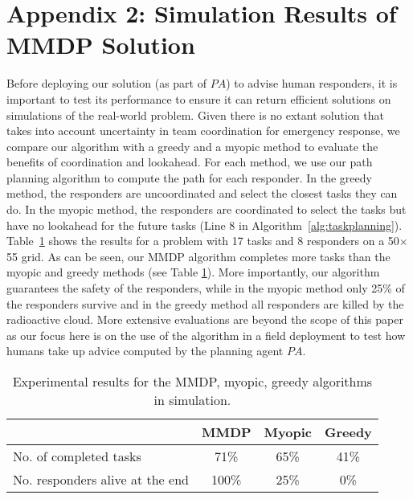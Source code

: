 

\section*{Appendix 2: Simulation Results of MMDP Solution}\label{sec:appendix2}



\noindent Before deploying our solution (as part of $PA$) to advise
human responders, it is important  to test its performance to
ensure it can return efficient solutions on simulations of the
real-world problem. Given there is no extant solution that
takes into account uncertainty in team coordination for emergency
response, we compare our algorithm with a greedy and a
myopic method to evaluate the benefits of coordination and
lookahead. For each method, we use our path planning algorithm to
compute the path for each responder. In the greedy method, the responders
are uncoordinated and select the closest tasks they can do. In
the myopic method, the responders are coordinated to select the
tasks but have no lookahead for the future tasks (Line 8 in
Algorithm~\ref{alg:taskplanning}). Table~\ref{tab:simulation} shows
the results for a problem with 17 tasks and 8 responders on a
50$\times$55 grid. As can be seen, our MMDP algorithm 
completes more tasks than the myopic and greedy methods (see Table
\ref{tab:simulation}). More importantly, our algorithm guarantees
the safety of the responders, while in the myopic method  only 25\%
of the responders survive and in the greedy method all responders
are killed by the radioactive cloud. More extensive evaluations are
beyond the scope of this paper as our focus here is on the use of
the algorithm in a field deployment to test how humans take up
advice computed by the planning agent $PA$.
\begin{table}[htbp]
  \centering
  \caption{Experimental results for the MMDP, myopic, greedy
  algorithms in simulation.}
  \begin{tabular}{l|c|c|c}
   & MMDP & Myopic & Greedy \\
  \hline
  No. of completed tasks & 71\% & 65\% & 41\% \\
  \hline
  No. responders alive at the end & 100\% & 25\% & 0\% \\
  \end{tabular}
  \label{tab:simulation}\vspace{-3mm}
\end{table}
